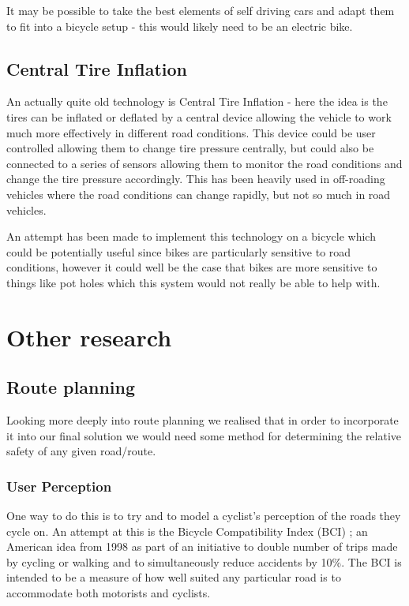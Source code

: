 \documentclass[a4paper]{report}
\begin{document}
{It may be possible to take the best elements of self driving cars and adapt them to fit into a bicycle setup - this would likely need to be an electric bike.
\subsection{Central Tire Inflation}
An actually quite old technology is Central Tire Inflation - here the idea is the tires can be inflated or deflated by a central device allowing the vehicle to work much more effectively in different road conditions. This device could be user controlled allowing them to change tire pressure centrally, but could also be connected to a series of sensors allowing them to monitor the road conditions and change the tire pressure accordingly. This has been heavily used in off-roading vehicles where the road conditions can change rapidly, but not so much in road vehicles. \cite{ctis} 

An attempt has been made to implement this technology on a bicycle\cite{ctis_bike} which could be potentially useful since bikes are particularly sensitive to road conditions, however it could well be the case that bikes are more sensitive to things like pot holes which this system would not really be able to help with.
\newpage
\section{Other research}
\subsection{Route planning}
Looking more deeply into route planning we realised that in order to incorporate it into our final solution we would need some method for determining the relative safety of any given road/route.

\subsubsection{User Perception}
One way to do this is to try and to model a cyclist's perception of the roads they cycle on. An attempt at this is the Bicycle Compatibility Index (BCI) \cite{bci-manual}; an American idea from 1998 as part of an initiative to double number of trips made by cycling or walking and to simultaneously reduce accidents by 10\%. The BCI is intended to be a measure of how well suited any particular road is to accommodate both motorists and cyclists.

}
\end{document}
